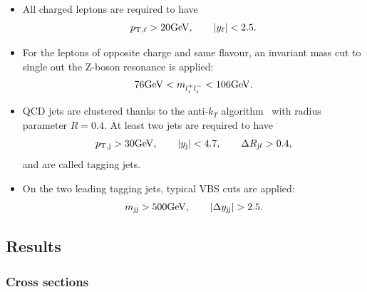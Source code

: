 \documentclass[11pt]{cernrep}
\begin{document}
\begin{itemize}
\item All charged leptons are required to have
    \begin{align}
        \label{cut:1}
         p_{\rm T, \ell} >  20{\rm GeV},\qquad |y_{\ell}| < 2.5.
    \end{align}
\item For the leptons of opposite charge and same flavour, an invariant mass cut to single out the Z-boson resonance is applied:
    \begin{align}
        \label{cut:2}
         76 {\rm GeV} < m_{l_i^+ l_i^-} < 106 {\rm GeV}.
    \end{align}

\item QCD jets are clustered thanks to the anti-$k_T$ algorithm~\cite{Cacciari:2008gp} with radius parameter $R=0.4$.
      At least two jets are required to have
        \begin{align}
        \label{cut:3}
         p_{\rm T, j} >  30{\rm GeV}, \qquad |y_{\rm j}| < 4.7, \qquad \Delta R_{\rm j \ell} > 0.4,
        \end{align}
        and are called tagging jets.
\item On the two leading tagging jets, typical VBS cuts are applied:
        \begin{align}
        \label{cut:4}
         m_{\rm j j} >  500{\rm GeV},\qquad |\Delta y_{\rm j j}| > 2.5.
        \end{align}
\end{itemize}

\subsection{Results \label{vbs_results}}

\subsubsection*{Cross sections}
\end{document}

